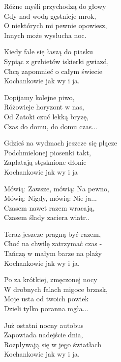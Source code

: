 \begin{text}
    Różne myśli przychodzą do głowy\\
    Gdy nad wodą gęstnieje mrok,\\
    O niektórych mi pewnie opowiesz,\\
    Innych może wysłucha noc.

    Kiedy fale się łaszą do piasku\\
    Sypiąc z grzbietów iskierki gwiazd,\\
    Chcą zapomnieć o całym świecie\\
    Kochankowie jak wy i ja.

    Dopijamy kolejne piwo,\\
    Różowieje horyzont w nas,\\
    Od Zatoki czuć lekką bryzę,\\
    Czas do domu, do domu czas...

    Gdzieś na wydmach jeszcze się plącze\\
    Podchmielonej piosenki takt,\\
    Zaplatają stęsknione dłonie\\
    Kochankowie jak wy i ja

    Mówią: Zawsze, mówią: Na pewno,\\
    Mówią: Nigdy, mówią: Nie ja...\\
    Czasem nawet razem wracają,\\
    Czasem ślady zaciera wiatr..

    Teraz jeszcze pragną być razem,\\
    Choć na chwilę zatrzymać czas -\\
    Tańczą w małym barze na plaży\\
    Kochankowie jak wy i ja.

    Po za krótkiej, zmęczonej nocy\\
    W drobnych falach migoce brzask,\\
    Moje usta od twoich powiek\\
    Dzieli tylko poranna mgła...

    Już ostatni nocny autobus\\
    Zapowiada nadejście dnia,\\
    Rozpływają się w jego światłach\\
    Kochankowie jak wy i ja.
\end{text}
\begin{chord}

\end{chord}